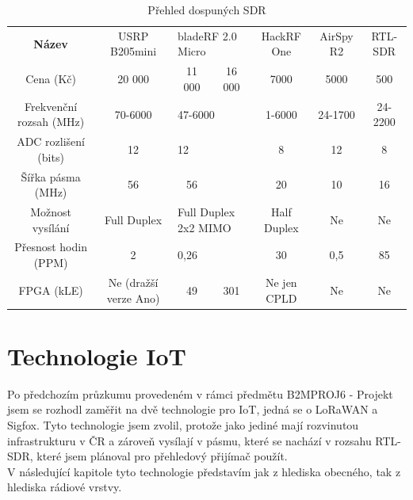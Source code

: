 \documentclass{ctuthesis}
\begin{document}
\begin{table}
\begin{ctucolortab}
\begin{tabular}{c|cccccc}
\bfseries
Název                   & USRP B205mini         & \multicolumn{2}{l}{bladeRF 2.0 Micro}    & HackRF One  & AirSpy R2 & RTL-SDR \\ \Midrule
Cena (Kč)               & 20 000                & 11 000              & 16 000             & 7000        & 5000      & 500     \\
Frekvenční rozsah (MHz) & 70-6000               & \multicolumn{2}{l}{47-6000}              & 1-6000      & 24-1700   & 24-2200 \\
ADC rozlišení (bits)    & 12                    & \multicolumn{2}{l}{12}                   & 8           & 12        & 8       \\
Šířka pásma (MHz)       & 56                    & 56                  &                    & 20          & 10        & 16      \\
Možnost vysílání        & Full Duplex           & \multicolumn{2}{l}{Full Duplex 2x2 MIMO} & Half Duplex & Ne        & Ne      \\
Přesnost hodin (PPM)    & 2                     & \multicolumn{2}{l}{0,26}                 & 30          & 0,5       & 85      \\
FPGA (kLE)              & Ne (dražší verze Ano) & 49                  & 301                & Ne jen CPLD & Ne        & Ne      \\ 
\end{tabular}
\end{ctucolortab}
\caption{Přehled dospuných SDR}
\label{tab:sdr}
\cite{etusresearch}
\cite{sdrreview2016}
\cite{itead}
\cite{sdrshowdown}
\end{table}

\chapter{Technologie IoT}
Po předchozím průzkumu provedeném v rámci předmětu B2MPROJ6 - Projekt jsem se rozhodl zaměřit na dvě technologie pro IoT, jedná se o LoRaWAN a Sigfox. Tyto technologie jsem zvolil, protože jako jediné mají rozvinutou infrastrukturu v ČR a zároveň vysílají v pásmu, které se nachází v rozsahu RTL-SDR, které jsem plánoval pro přehledový přijímač použít.\\
V následující kapitole tyto technologie představím jak z hlediska obecného, tak z hlediska rádiové vrstvy.
\end{document}
